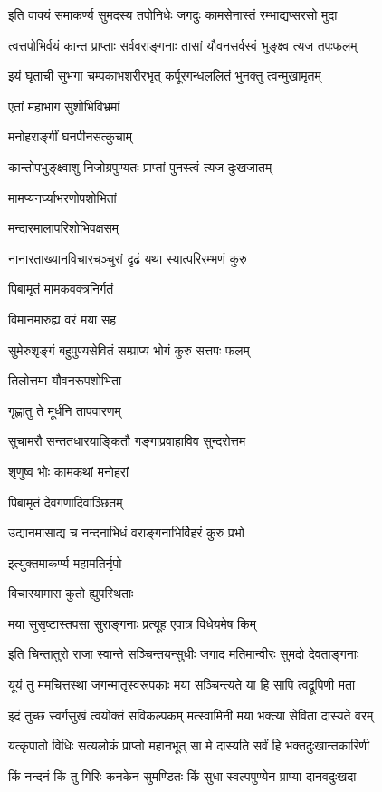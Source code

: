 \twolineshloka
{इति वाक्यं समाकर्ण्य सुमदस्य तपोनिधेः}
{जगदुः कामसेनास्तं रम्भाद्यप्सरसो मुदा}%

\twolineshloka
{त्वत्तपोभिर्वयं कान्त प्राप्ताः सर्ववराङ्गनाः}
{तासां यौवनसर्वस्वं भुङ्क्ष्व त्यज तपःफलम्}%

\twolineshloka
{इयं घृताची सुभगा चम्पकाभशरीरभृत्}
{कर्पूरगन्धललितं भुनक्तु त्वन्मुखामृतम्}%

एतां महाभाग सुशोभिविभ्रमां

मनोहराङ्गीं घनपीनसत्कुचाम्

\twolineshloka
{कान्तोपभुङ्क्ष्वाशु निजोग्रपुण्यतः}
{प्राप्तां पुनस्त्वं त्यज दुःखजातम्}%

मामप्यनर्घ्याभरणोपशोभितां

मन्दारमालापरिशोभिवक्षसम्

\twolineshloka
{नानारताख्यानविचारचञ्चुरां}
{दृढं यथा स्यात्परिरम्भणं कुरु}%

पिबामृतं मामकवक्त्रनिर्गतं

विमानमारुह्य वरं मया सह

\twolineshloka
{सुमेरुशृङ्गं बहुपुण्यसेवितं}
{सम्प्राप्य भोगं कुरु सत्तपः फलम्}%

तिलोत्तमा यौवनरूपशोभिता

गृह्णातु ते मूर्धनि तापवारणम्

\twolineshloka
{सुचामरौ सन्ततधारयाङ्कितौ}
{गङ्गाप्रवाहाविव सुन्दरोत्तम}%

शृणुष्व भोः कामकथां मनोहरां

पिबामृतं देवगणादिवाञ्छितम्

\twolineshloka
{उद्यानमासाद्य च नन्दनाभिधं}
{वराङ्गनाभिर्विहरं कुरु प्रभो}%

इत्युक्तमाकर्ण्य महामतिर्नृपो

विचारयामास कुतो ह्युपस्थिताः

\twolineshloka
{मया सुसृष्टास्तपसा सुराङ्गनाः}
{प्रत्यूह एवात्र विधेयमेष किम्}%

\twolineshloka
{इति चिन्तातुरो राजा स्वान्ते सञ्चिन्तयन्सुधीः}
{जगाद मतिमान्वीरः सुमदो देवताङ्गनाः}%

\twolineshloka
{यूयं तु ममचित्तस्था जगन्मातृस्वरूपकाः}
{मया सञ्चिन्त्यते या हि सापि त्वद्रूपिणी मता}%

\twolineshloka
{इदं तुच्छं स्वर्गसुखं त्वयोक्तं सविकल्पकम्}
{मत्स्वामिनी मया भक्त्या सेविता दास्यते वरम्}%

\twolineshloka
{यत्कृपातो विधिः सत्यलोकं प्राप्तो महानभूत्}
{सा मे दास्यति सर्वं हि भक्तदुःखान्तकारिणी}%

\twolineshloka
{किं नन्दनं किं तु गिरिः कनकेन सुमण्डितः}
{किं सुधा स्वल्पपुण्येन प्राप्या दानवदुःखदा}%

